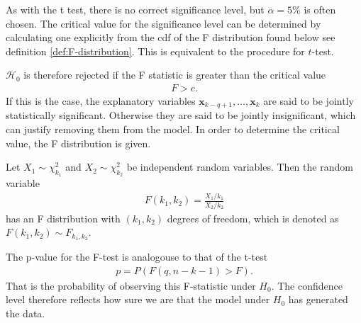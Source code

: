 As with the t test, there is no correct significance level, but $\alpha = 5 \%$ is often chosen. 
The critical value for the significance level can be determined by calculating one explicitly from the cdf of the F distribution found below see definition \ref{def:F-distribution}. 
This is equivalent to the procedure for $t$-test.

$\mathcal{H}_0$ is therefore rejected if the F statistic is greater than the critical value
\begin{align*}
    F>c.
\end{align*}
If this is the case, the explanatory variables $\textbf{x}_{k-q+1}, \ldots, \textbf{x}_k$ are said to be jointly statistically significant. 
Otherwise they are said to be jointly insignificant, which can justify removing them from the model. 
In order to determine the critical value, the F distribution is given.
\begin{definition}[F Distribution]\label{def:F-distribution}
    Let $X_1 \sim \chi_{k_1}^2$ and $X_2 \sim \chi_{k_2}^2$ be independent random variables. Then the random variable 
        \begin{align*}
            F(k_1,k_2) = \frac{X_1/k_1}{X_2/k_2}
        \end{align*}
    has an F distribution with $(k_1, k_2)$ degrees of freedom, which is denoted as $F(k_1,k_2) \sim F_{k_1, k_2}$.
\end{definition}
The p-value for the F-test is analogouse to that of the t-test
\begin{align*}
    p = P(F(q,n-k-1) > F).
\end{align*}
That is the probability of observing this F-statistic under $H_0$. The confidence level therefore reflects how sure we are that the model under $H_0$ has generated the data.

